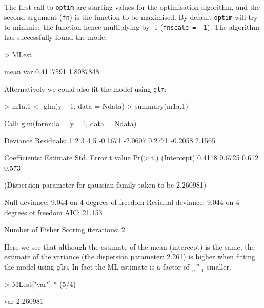 \documentclass{article}
\begin{document}
\iftalk
\else
\fi

The first call to \texttt{optim} are starting values for the optimisation algorithm, and the second argument (\texttt{fn}) is the function to be maximised. By default \texttt{optim} will try to minimise the function hence multiplying by -1 (\texttt{fnscale = -1}).  The algorithm has successfully found the mode:

\begin{Schunk}
\begin{Sinput}
> MLest
\end{Sinput}
\begin{Soutput}
     mean       var 
0.4117591 1.8087848 
\end{Soutput}
\end{Schunk}

Alternatively we could also fit the model using \texttt{glm}:

\begin{Schunk}
\begin{Sinput}
> m1a.1 <- glm(y ~ 1, data = Ndata)
> summary(m1a.1)
\end{Sinput}
\begin{Soutput}
Call:
glm(formula = y ~ 1, data = Ndata)

Deviance Residuals: 
      1        2        3        4        5  
-0.1671  -2.0607   0.2771  -0.2058   2.1565  

Coefficients:
            Estimate Std. Error t value Pr(>|t|)
(Intercept)   0.4118     0.6725   0.612    0.573

(Dispersion parameter for gaussian family taken to be 2.260981)

    Null deviance: 9.044  on 4  degrees of freedom
Residual deviance: 9.044  on 4  degrees of freedom
AIC: 21.153

Number of Fisher Scoring iterations: 2
\end{Soutput}
\end{Schunk}
 
Here we see that although the estimate of the mean (intercept) is the same, the estimate of the variance (the dispersion parameter: 2.261) is higher when fitting the model using \texttt{glm}. In fact the ML estimate is a factor of $\frac{n}{n-1}$ smaller.

\begin{Schunk}
\begin{Sinput}
> MLest["var"] * (5/4)
\end{Sinput}
\begin{Soutput}
     var 
2.260981 
\end{Soutput}
\end{Schunk}
\end{document}
